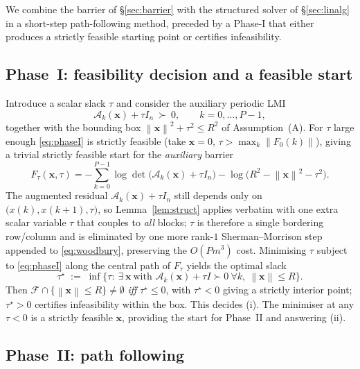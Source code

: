 \documentclass{amsart}
\newcommand{\norm}[1]{\left\lVert#1\right\rVert}
\begin{document}
We combine the barrier of \S\ref{sec:barrier} with the structured solver of
\S\ref{sec:linalg} in a short-step path-following method, preceded by a Phase-I that
either produces a strictly feasible starting point or certifies infeasibility.

\subsection{Phase~I: feasibility decision and a feasible start}\label{sec:phaseI}

Introduce a scalar slack $\tau$ and consider the auxiliary periodic LMI
\begin{equation}\label{eq:phaseI}
  \mathcal A_k(\bm x)+\tau I_n\ \succ\ 0,\qquad k=0,\dots,P-1,
\end{equation}
together with the bounding box $\norm{\bm x}^2+\tau^2\le R^2$ of Assumption~(A).
For $\tau$ large enough \eqref{eq:phaseI} is strictly feasible (take $\bm x=0$,
$\tau>\max_k\norm{F_0(k)}$), giving a trivial strictly feasible start for the
\emph{auxiliary} barrier
\[
  F_\tau(\bm x,\tau)=-\sum_{k=0}^{P-1}\log\det\big(\mathcal A_k(\bm x)+\tau I_n\big)
                     -\log\big(R^2-\norm{\bm x}^2-\tau^2\big).
\]
The augmented residual $\mathcal A_k(\bm x)+\tau I_n$ still depends only on
$\big(x(k),x(k+1),\tau\big)$, so Lemma~\ref{lem:struct} applies verbatim with one
extra scalar variable $\tau$ that couples to \emph{all} blocks; $\tau$ is therefore a
single bordering row/column and is eliminated by one more rank-$1$
Sherman--Morrison step appended to \eqref{eq:woodbury}, preserving the $O(Pm^3)$
cost. Minimising $\tau$ subject to \eqref{eq:phaseI} along the central path of
$F_\tau$ yields the optimal slack
\[
  \tau^\star\;:=\;\inf\{\tau:\ \exists\,\bm x\ \text{with }\mathcal A_k(\bm x)+\tau I\succ0\ \forall k,\ \norm{\bm x}\le R\}.
\]
Then $\mathcal F\cap\{\norm{\bm x}\le R\}\neq\emptyset$ \emph{iff} $\tau^\star\le0$,
with $\tau^\star<0$ giving a strictly interior point; $\tau^\star>0$ certifies
infeasibility within the box. This decides (i). The minimiser at any $\tau<0$ is a
strictly feasible $\bm x$, providing the start for Phase~II and answering (ii).

\subsection{Phase~II: path following}
\end{document}
